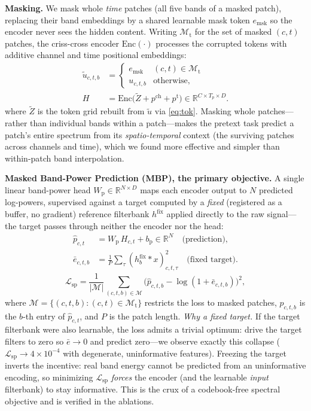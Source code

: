 \documentclass[letterpaper]{article} %
\begin{document}
\noindent\textbf{Masking.} We mask whole \emph{time} patches (all five bands of a
masked patch), replacing their band embeddings by a shared learnable mask token
$e_{\mathrm{msk}}$ so the encoder never sees the hidden content. Writing
$\mathcal{M}_{\mathrm t}$ for the set of masked $(c,t)$ patches, the criss-cross
encoder $\mathrm{Enc}(\cdot)$ processes the corrupted tokens with additive channel
and time positional embeddings:
\begin{align}
\tilde u_{c,t,b} &=
\begin{cases}e_{\mathrm{msk}} & (c,t)\in\mathcal{M}_{\mathrm t}\\ u_{c,t,b} & \text{otherwise,}\end{cases} \label{eq:mask}\\
H &= \mathrm{Enc}\!\big(\tilde Z+p^{\mathrm{ch}}+p^{\mathrm{t}}\big)\in\mathbb{R}^{C\times T_p\times D}. \label{eq:enc}
\end{align}
where $\tilde Z$ is the token grid rebuilt from $\tilde u$ via \eqref{eq:tok}.
Masking whole patches---rather than individual bands within a patch---makes the
pretext task predict a patch's entire spectrum from its \emph{spatio-temporal}
context (the surviving patches across channels and time), which we found more
effective and simpler than within-patch band interpolation.

\noindent\textbf{Masked Band-Power Prediction (MBP), the primary objective.} A single linear
band-power head $W_{\mathrm p}\in\mathbb{R}^{N\times D}$ maps each encoder output to
$N$ predicted log-powers, supervised against a target computed by a \emph{fixed}
(registered as a buffer, no gradient) reference filterbank $h^{\mathrm{fix}}$
applied directly to the raw signal---the target passes through neither the encoder
nor the head:
\begin{align}
\hat p_{c,t}   &= W_{\mathrm p}\,H_{c,t}+b_{\mathrm p}\in\mathbb{R}^{N}
\quad\text{(prediction)}, \label{eq:pred}\\
\bar e_{c,t,b} &= \tfrac1P\!\sum_\tau (h^{\mathrm{fix}}_b*x)^2_{c,t,\tau}
\quad\text{(fixed target)}. \label{eq:target}
\end{align}
\begin{equation}
\mathcal{L}_{\mathrm{sp}}=\frac{1}{|\mathcal{M}|}\!\!\sum_{(c,t,b)\in\mathcal{M}}\!\!
\big(\hat p_{c,t,b}-\log(1+\bar e_{c,t,b})\big)^2,
\label{eq:lsp}
\end{equation}
where $\mathcal{M}{=}\{(c,t,b):(c,t)\in\mathcal{M}_{\mathrm t}\}$ restricts the loss
to masked patches, $\hat p_{c,t,b}$ is the $b$-th entry of $\hat p_{c,t}$, and $P$
is the patch length. \emph{Why a fixed target.} If the target filterbank were also
learnable, the loss admits a trivial optimum: drive the target filters to zero so
$\bar e\to0$ and predict zero---we observe exactly this collapse
($\mathcal{L}_{\mathrm{sp}}{\to}4{\times}10^{-4}$ with degenerate, uninformative
features). Freezing the target inverts the incentive: real band energy cannot be
predicted from an uninformative encoding, so minimizing $\mathcal{L}_{\mathrm{sp}}$
\emph{forces} the encoder (and the learnable \emph{input} filterbank) to stay
informative. This is the crux of a codebook-free spectral objective and is verified
in the ablations.
\end{document}
